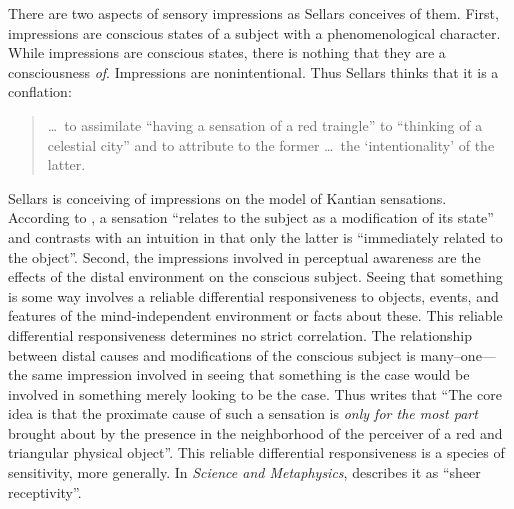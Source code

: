 \documentclass[12pt]{article}
\begin{document}

There are two aspects of sensory impressions as Sellars conceives of them. First, impressions are conscious states of a subject with a phenomenological character. While impressions are conscious states, there is nothing that they are a consciousness \emph{of}. Impressions are nonintentional. Thus Sellars thinks that it is a conflation:
\begin{quote}
    \ldots\ to assimilate ``having a sensation of a red traingle'' to ``thinking of a celestial city'' and to attribute to the former \ldots\ the `intentionality' of the latter. \citep[§7]{Sellars:1956xp}
\end{quote}
Sellars is conceiving of impressions on the model of Kantian sensations. According to \citet[B376--7]{Kant:1781fk}, a sensation ``relates to the subject as a modification of its state'' and contrasts with  an intuition in that only the latter is ``immediately related to the object''. Second, the impressions involved in perceptual awareness are the effects of the distal environment on the conscious subject. Seeing that something is some way involves a reliable differential responsiveness to objects, events, and features of the mind-independent environment or facts about these. This reliable differential responsiveness determines no strict correlation. The relationship between distal causes and modifications of the conscious subject is many--one---the same impression involved in seeing that something is the case would be involved in something merely looking to be the case. Thus \citet[§7]{Sellars:1956xp} writes that ``The core idea is that the proximate cause of such a sensation is \emph{only for the most part} brought about by the presence in the neighborhood of the perceiver of a red and triangular physical object''. This reliable differential responsiveness is a species of sensitivity, more generally. In \emph{Science and Metaphysics}, \citet[4]{Sellars:1967uq} describes it as ``sheer receptivity''.
\end{document}
